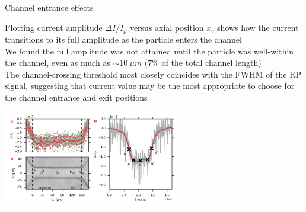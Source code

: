 

\begin{frame}[c]{Channel entrance effects}
	
	{\scriptsize
		Plotting current amplitude $\Delta I/I_{p}$ versus axial position $x_{c}$ shows how the current transitions to its full amplitude as the particle enters the channel \\
		\vspace{.1in}
		We found the full amplitude was not attained until the particle was well-within the channel, even as much as $\sim\SI{10}{\mu m}$ ($7\%$ of the total channel length) \\
		\vspace{.1in}
		The channel-crossing threshold most closely coincides with the FWHM of the RP signal, suggesting that current value may be the most appropriate to choose for the channel entrance and exit positions \\
	}
	
	
	{\centering
		\includegraphics[width=3in]{channelentrancestraight.pdf} \\
		\par
	}
	

	
\end{frame}




